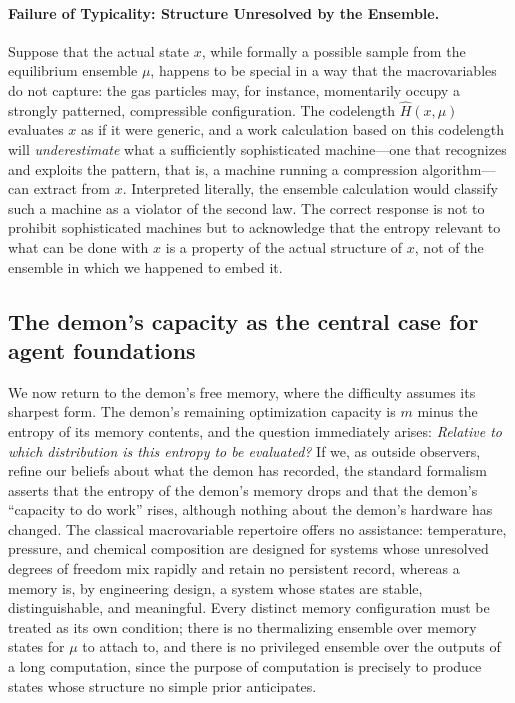 \documentclass[10pt]{article}
\theoremstyle{definition}
\theoremstyle{remark}
\begin{document}
\paragraph{Failure of Typicality: Structure Unresolved by the Ensemble.} Suppose that the actual state $x$, while formally a possible sample from the equilibrium ensemble $\mu$, happens to be special in a way that the macrovariables do not capture: the gas particles may, for instance, momentarily occupy a strongly patterned, compressible configuration. The codelength $\hat H(x,\mu)$ evaluates $x$ as if it were generic, and a work calculation based on this codelength will \emph{underestimate} what a sufficiently sophisticated machine---one that recognizes and exploits the pattern, that is, a machine running a compression algorithm---can extract from $x$. Interpreted literally, the ensemble calculation would classify such a machine as a violator of the second law. The correct response is not to prohibit sophisticated machines but to acknowledge that the entropy relevant to what can be done with $x$ is a property of the actual structure of $x$, not of the ensemble in which we happened to embed it.

\subsection{The demon's capacity as the central case for agent foundations}
\label{sec:centralcase}

We now return to the demon's free memory, where the difficulty assumes its sharpest form. The demon's remaining optimization capacity is $m$ minus the entropy of its memory contents, and the question immediately arises: \emph{Relative to which distribution is this entropy to be evaluated?} If we, as outside observers, refine our beliefs about what the demon has recorded, the standard formalism asserts that the entropy of the demon's memory drops and that the demon's ``capacity to do work'' rises, although nothing about the demon's hardware has changed. The classical macrovariable repertoire offers no assistance: temperature, pressure, and chemical composition are designed for systems whose unresolved degrees of freedom mix rapidly and retain no persistent record, whereas a memory is, by engineering design, a system whose states are stable, distinguishable, and meaningful. Every distinct memory configuration must be treated as its own condition; there is no thermalizing ensemble over memory states for $\mu$ to attach to, and there is no privileged ensemble over the outputs of a long computation, since the purpose of computation is precisely to produce states whose structure no simple prior anticipates.
\end{document}
